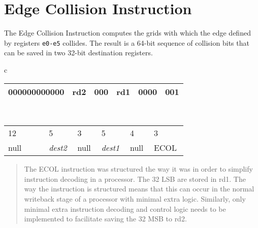 \section{Edge Collision Instruction}
The Edge Collision Instruction computes the grids with which the edge defined by registers \texttt{e0-e5} collides. The result is a 64-bit sequence of collision bits that can be saved in two 32-bit destination registers.

\begin{table}[H]
\begin{center}
\begin{tabular}{c}
    \begin{tabular}{|m{0.2\linewidth}|m{0.1\linewidth}|m{0.1\linewidth}|m{0.1\linewidth}|m{0.1\linewidth}|m{0.1\linewidth}|}
    \hline
    \hspace*{0.5cm}000000000000 & \hspace*{0.5cm}rd2  & \hspace*{0.5cm}000  & \hspace*{0.5cm}rd1  & \hspace*{0.5cm}0000  & \hspace*{0.5cm}001  \\
    \hline
    \end{tabular} \\
    \begin{tabular}{m{0.2\linewidth}m{0.1\linewidth}m{0.1\linewidth}m{0.1\linewidth}m{0.1\linewidth}m{0.1\linewidth}}
    \hspace*{1.5cm}12 & \hspace*{0.5cm}5  & \hspace*{0.5cm}3  & \hspace*{0.5cm}5  & \hspace*{0.5cm}4  & \hspace*{0.5cm}3  \\
    \hspace*{1.3cm}null &  \hspace*{0.5cm}\textit{dest2} & \hspace*{0.5cm}null  & \hspace*{0.5cm}\textit{dest1}  &  \hspace*{0.5cm}null & \hspace*{0.25cm}ECOL  \\
    \end{tabular}
\end{tabular}
\end{center}
\end{table}

\begin{quote}{}
    The ECOL instruction was structured the way it was in order to simplify instruction decoding in a processor. The 32 \gls{LSB} are stored in rd1. The way the instruction is structured means that this can occur in the normal writeback stage of a processor with minimal extra logic. Similarly, only minimal extra instruction decoding and control logic needs to be implemented to facilitate saving the 32 \gls{MSB} to rd2.
\end{quote}